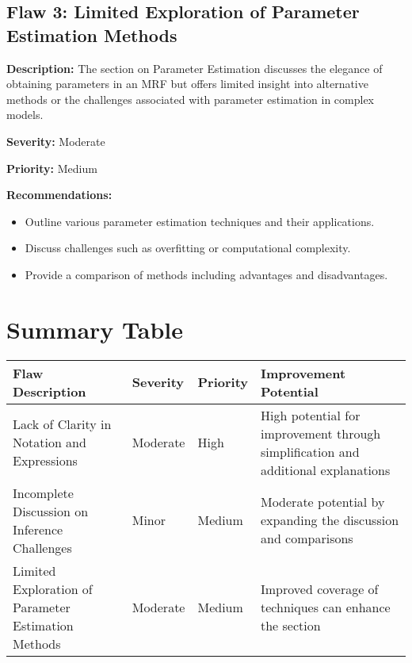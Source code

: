 \documentclass{article}
\begin{document}
\subsection*{Flaw 3: Limited Exploration of Parameter Estimation Methods}

\textbf{Description:} The section on Parameter Estimation discusses the elegance of obtaining parameters in an MRF but offers limited insight into alternative methods or the challenges associated with parameter estimation in complex models.

\textbf{Severity:} Moderate

\textbf{Priority:} Medium

\textbf{Recommendations:}
\begin{itemize}
    \item Outline various parameter estimation techniques and their applications.
    \item Discuss challenges such as overfitting or computational complexity.
    \item Provide a comparison of methods including advantages and disadvantages.
\end{itemize}

\newpage
\section*{Summary Table}

\begin{longtable}{|p{4cm}|p{2.5cm}|p{2.5cm}|p{3.5cm}|}
\hline
\textbf{Flaw Description} & \textbf{Severity} & \textbf{Priority} & \textbf{Improvement Potential} \\
\hline
Lack of Clarity in Notation and Expressions & Moderate & High & High potential for improvement through simplification and additional explanations \\
\hline
Incomplete Discussion on Inference Challenges & Minor & Medium & Moderate potential by expanding the discussion and comparisons \\
\hline
Limited Exploration of Parameter Estimation Methods & Moderate & Medium & Improved coverage of techniques can enhance the section \\
\hline
\end{longtable}
\end{document}
